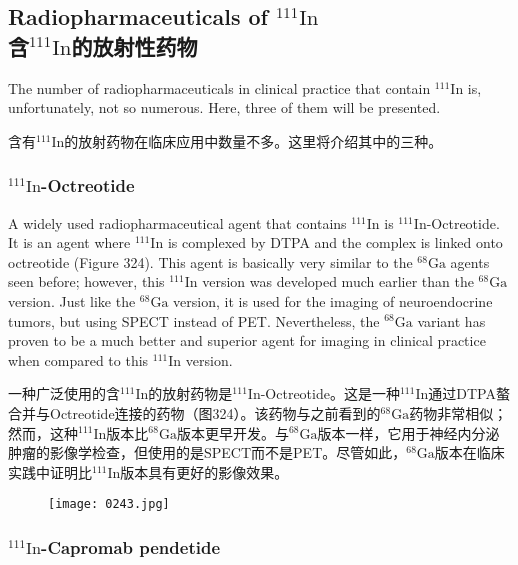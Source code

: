 \documentclass[dvipsnames, svgnames,a4paper,11pt]{article}
\begin{document}
\subsection{Radiopharmaceuticals of \(\mathrm{^{111}In}\)\\含\(\mathrm{^{111}In}\)的放射性药物}  
The number of radiopharmaceuticals in clinical practice that contain \(\mathrm{^{111}In}\) is, unfortunately, not so numerous. Here, three of them will be presented.

含有\(\mathrm{^{111}In}\)的放射药物在临床应用中数量不多。这里将介绍其中的三种。

\subsubsection{\(\mathrm{^{111}In}\)-Octreotide}  
A widely used radiopharmaceutical agent that contains \(\mathrm{^{111}In}\) is \(\mathrm{^{111}In}\)-Octreotide. It is an agent where \(\mathrm{^{111}In}\) is complexed by DTPA and the complex is linked onto octreotide (Figure 324). This agent is basically very similar to the \(\mathrm{^{68}Ga}\) agents seen before; however, this \(\mathrm{^{111}In}\) version was developed much earlier than the \(\mathrm{^{68}Ga}\) version. Just like the \(\mathrm{^{68}Ga}\) version, it is used for the imaging of neuroendocrine tumors, but using SPECT instead of PET. Nevertheless, the \(\mathrm{^{68}Ga}\) variant has proven to be a much better and superior agent for imaging in clinical practice when compared to this \(\mathrm{^{111}In}\) version.

一种广泛使用的含\(\mathrm{^{111}In}\)的放射药物是\(\mathrm{^{111}In}\)-Octreotide。这是一种\(\mathrm{^{111}In}\)通过DTPA螯合并与Octreotide连接的药物（图324）。该药物与之前看到的\(\mathrm{^{68}Ga}\)药物非常相似；然而，这种\(\mathrm{^{111}In}\)版本比\(\mathrm{^{68}Ga}\)版本更早开发。与\(\mathrm{^{68}Ga}\)版本一样，它用于神经内分泌肿瘤的影像学检查，但使用的是SPECT而不是PET。尽管如此，\(\mathrm{^{68}Ga}\)版本在临床实践中证明比\(\mathrm{^{111}In}\)版本具有更好的影像效果。

\begin{figure}[h]
	\centering
    \texttt{[image: 0243.jpg]}  
     \label{fig324}
\end{figure}


\subsubsection{\(\mathrm{^{111}In}\)-Capromab pendetide }  
\end{document}
